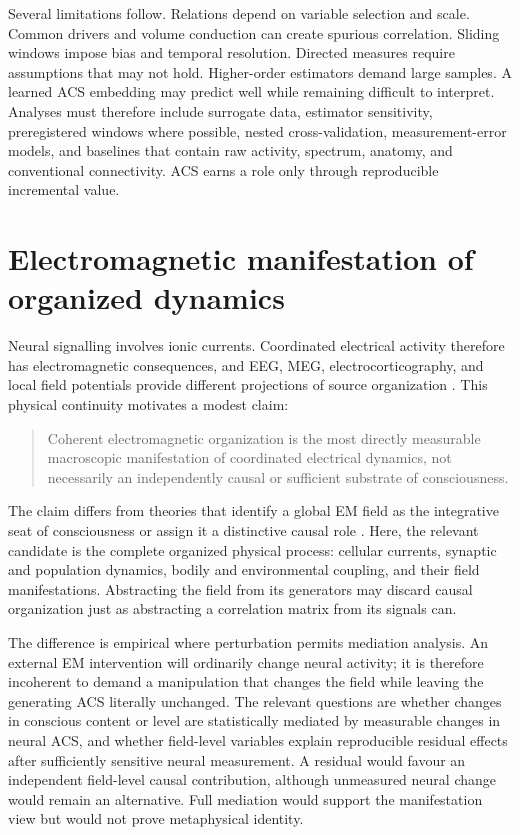\documentclass[
  11pt,
  a4paper,
]{article}
\begin{document}
Several limitations follow. Relations depend on variable selection and
scale. Common drivers and volume conduction can create spurious
correlation. Sliding windows impose bias and temporal resolution.
Directed measures require assumptions that may not hold. Higher-order
estimators demand large samples. A learned ACS embedding may predict
well while remaining difficult to interpret. Analyses must therefore
include surrogate data, estimator sensitivity, preregistered windows
where possible, nested cross-validation, measurement-error models, and
baselines that contain raw activity, spectrum, anatomy, and conventional
connectivity. ACS earns a role only through reproducible incremental
value.

\section{Electromagnetic manifestation of organized
dynamics}\label{electromagnetic-manifestation-of-organized-dynamics}

Neural signalling involves ionic currents. Coordinated electrical
activity therefore has electromagnetic consequences, and EEG, MEG,
electrocorticography, and local field potentials provide different
projections of source organization \citep{nunez2006}. This physical
continuity motivates a modest claim:

\begin{quote}
Coherent electromagnetic organization is the most directly measurable
macroscopic manifestation of coordinated electrical dynamics, not
necessarily an independently causal or sufficient substrate of
consciousness.
\end{quote}

The claim differs from theories that identify a global EM field as the
integrative seat of consciousness or assign it a distinctive causal role
\citep{pockett2000, mcfadden2020}. Here, the relevant candidate is the
complete organized physical process: cellular currents, synaptic and
population dynamics, bodily and environmental coupling, and their field
manifestations. Abstracting the field from its generators may discard
causal organization just as abstracting a correlation matrix from its
signals can.

The difference is empirical where perturbation permits mediation
analysis. An external EM intervention will ordinarily change neural
activity; it is therefore incoherent to demand a manipulation that
changes the field while leaving the generating ACS literally unchanged.
The relevant questions are whether changes in conscious content or level
are statistically mediated by measurable changes in neural ACS, and
whether field-level variables explain reproducible residual effects
after sufficiently sensitive neural measurement. A residual would favour
an independent field-level causal contribution, although unmeasured
neural change would remain an alternative. Full mediation would support
the manifestation view but would not prove metaphysical identity.
\end{document}
